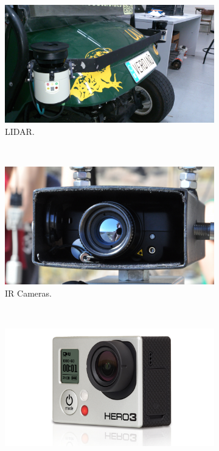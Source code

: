 \begin{figure}[h!]
        \centering
        \begin{subfigure}[b]{0.32\textwidth}
                \centering
                \includegraphics[width=\textwidth]{lidar}
                \caption{\ac{LIDAR}.}\label{fig:cp00_lidar}
        \end{subfigure}%
        ~ %
        \begin{subfigure}[b]{0.32\textwidth}
                \centering
                \includegraphics[width=\textwidth]{ircameras}
		\caption{IR Cameras.}\label{fig:cp00_ir_cameras}
        \end{subfigure}%
        ~ %
        \begin{subfigure}[b]{0.32\textwidth}
                \centering
                \includegraphics[width=\textwidth]{visiblecamera}

\end{subfigure}
\end{figure}
